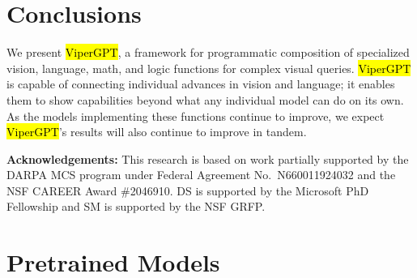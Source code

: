 \documentclass[10pt,twocolumn,letterpaper]{article}
\newcommand{\viper}[0]{{\small\fontfamily{txtt}\selectfont \textcolor{mygreen}{\hl{ViperGPT}}}\xspace}
\begin{document}
\vspace{-0.1cm}
\section{Conclusions}
\vspace{-0.1cm}

We present \viper, a framework for programmatic composition of specialized vision, language, math, and logic functions for complex visual queries. \viper is capable of connecting individual advances in vision and language; it enables them to show capabilities beyond what any individual model can do on its own. As the models implementing these functions continue to improve,  we expect \viper's results will also continue to improve in tandem.


{\small\textbf{Acknowledgements:} This research is based on work partially supported by the DARPA MCS program under Federal Agreement No.\ N660011924032 and the NSF CAREER Award \#2046910. DS is supported by the Microsoft PhD Fellowship and SM is supported by the NSF GRFP.}

{\small


}



\appendix
\clearpage

\onecolumn 

\section{Pretrained Models}
\label{sec:appendix_models}
\end{document}
